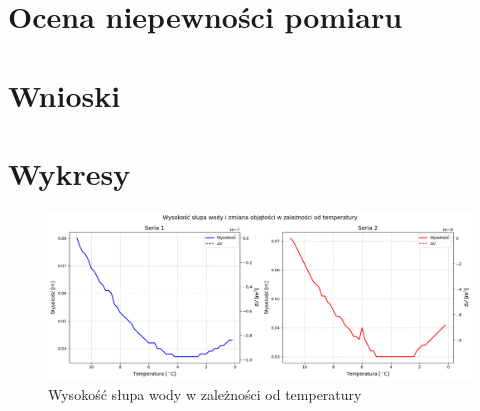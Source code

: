 \documentclass[a4paper,12pt]{article}
\begin{document}
\section{Ocena niepewności pomiaru}

\section{Wnioski}

\newpage
\section{Wykresy}

\begin{figure}[H]
    \centering
    \includegraphics[width=0.9\textheight,angle=90]{height_vs_temperature.png}
    \caption{Wysokość słupa wody w zależności od temperatury}
    \label{fig:height_vs_temperature}
\end{figure}




\end{document}
